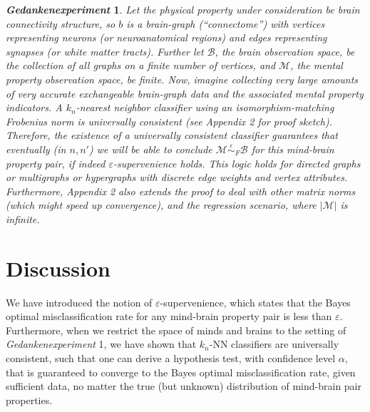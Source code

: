 \documentclass{article}
\newcommand{\mB}{\mathcal{B}}
\newcommand{\mM}{\mathcal{M}}
\newcommand{\eps}{\varepsilon}
\providecommand{\mc}[1]{\mathcal{#1}}
\newcommand{\MeB}{\mM \overset{\varepsilon}{{\sim}}_{F} \mB}
\newtheorem{thex}{\emph{Gedankenexperiment}}
\begin{document}
\begin{thex}
Let the physical property under consideration be brain connectivity structure, so $b$ is a brain-graph (``connectome'') with vertices representing neurons (or neuroanatomical regions) and edges representing synapses (or white matter tracts). Further let $\mB$, the brain observation space, be the collection of all graphs on a finite number of vertices, and $\mc{M}$, the mental property observation space, be finite. Now, imagine collecting very large amounts of very accurate exchangeable  brain-graph data and the associated mental property indicators. A $k_n$-nearest neighbor classifier using an isomorphism-matching Frobenius norm is universally consistent (see Appendix 2 for proof sketch). Therefore, %
the existence of a universally consistent classifier guarantees that eventually (in $n,n'$) we will be able to conclude $\MeB$ for this mind-brain property pair, if indeed $\varepsilon$-supervenience holds. This logic holds for directed graphs or multigraphs or hypergraphs with discrete edge weights and vertex attributes. Furthermore, Appendix 2 also extends the proof to deal with other matrix norms (which might speed up convergence), and the regression scenario, where $|\mM|$ is infinite.  
\end{thex}


\section*{Discussion}


We have introduced the notion of $\eps$-supervenience, which states that the Bayes optimal misclassification rate for any mind-brain property pair is less than $\eps$.  Furthermore, when we restrict the space of minds and brains to the setting of \emph{Gedankenexperiment}  1, we have shown that $k_n$-NN classifiers are universally consistent, such that one can derive a hypothesis test, with confidence level $\alpha$, that is guaranteed to converge to the Bayes optimal misclassification rate, given sufficient data, no matter the true (but unknown) distribution of mind-brain pair properties.  
\end{document}
